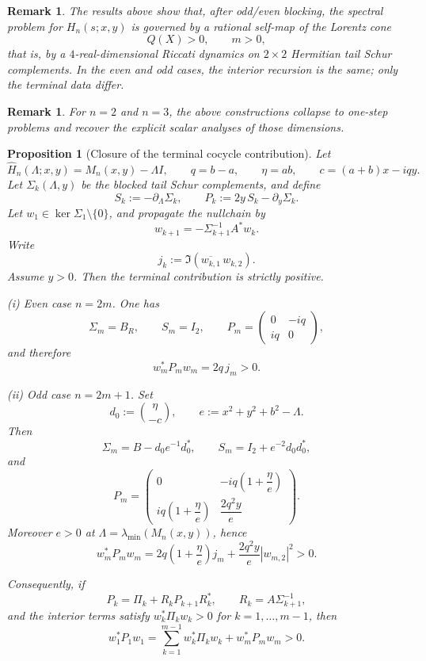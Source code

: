 \documentclass[11pt]{article}
\newtheorem{proposition}[lemma]{Proposition}
\newtheorem{remark}[lemma]{Remark}
\begin{document}
\begin{remark}
The results above show that, after odd/even blocking, the spectral problem for
\(H_n(s;x,y)\) is governed by a rational self-map of the Lorentz cone
\[
Q(X)>0,\qquad m>0,
\]
that is, by a \(4\)-real-dimensional Riccati dynamics on \(2\times 2\) Hermitian
tail Schur complements. In the even and odd cases, the interior recursion is the
same; only the terminal data differ.
\end{remark}

\begin{remark}
For \(n=2\) and \(n=3\), the above constructions collapse to one-step problems and
recover the explicit scalar analyses of those dimensions.
\end{remark}

\begin{proposition}[Closure of the terminal cocycle contribution]
Let
\[
\widehat H_n(\Lambda;x,y)=M_n(x,y)-\Lambda I,
\qquad
q=b-a,
\qquad
\eta=ab,
\qquad
c=(a+b)x-iqy.
\]
Let \(\Sigma_k(\Lambda,y)\) be the blocked tail Schur complements, and define
\[
S_k:=-\partial_\Lambda\Sigma_k,
\qquad
P_k:=2y\,S_k-\partial_y\Sigma_k.
\]
Let \(w_1\in\ker\Sigma_1\setminus\{0\}\), and propagate the nullchain by
\[
w_{k+1}=-\Sigma_{k+1}^{-1}A^*w_k.
\]
Write
\[
j_k:=\Im(\overline{w_{k,1}}\,w_{k,2}).
\]
Assume \(y>0\). Then the terminal contribution is strictly positive.

\smallskip

\noindent
\textup{(i) Even case \(n=2m\).} One has
\[
\Sigma_m=B_R,
\qquad
S_m=I_2,
\qquad
P_m=
\begin{pmatrix}
0 & -iq\\
iq & 0
\end{pmatrix},
\]
and therefore
\[
w_m^*P_mw_m=2q\,j_m>0.
\]

\smallskip

\noindent
\textup{(ii) Odd case \(n=2m+1\).} Set
\[
d_0:=\binom{\eta}{-c},
\qquad
e:=x^2+y^2+b^2-\Lambda.
\]
Then
\[
\Sigma_m=B-d_0e^{-1}d_0^*,
\qquad
S_m=I_2+e^{-2}d_0d_0^*,
\]
and
\[
P_m=
\begin{pmatrix}
0 & -iq\left(1+\dfrac{\eta}{e}\right)\\[1.2ex]
iq\left(1+\dfrac{\eta}{e}\right) & \dfrac{2q^2y}{e}
\end{pmatrix}.
\]
Moreover \(e>0\) at \(\Lambda=\lambda_{\min}(M_n(x,y))\), hence
\[
w_m^*P_mw_m
=
2q\left(1+\frac{\eta}{e}\right)j_m
+
\frac{2q^2y}{e}|w_{m,2}|^2
>0.
\]

\smallskip

Consequently, if
\[
P_k=\Pi_k+R_kP_{k+1}R_k^*,
\qquad
R_k=A\Sigma_{k+1}^{-1},
\]
and the interior terms satisfy \(w_k^*\Pi_kw_k>0\) for \(k=1,\dots,m-1\), then
\[
w_1^*P_1w_1
=
\sum_{k=1}^{m-1} w_k^*\Pi_kw_k+w_m^*P_mw_m
>0.
\]
\end{proposition}
\end{document}
